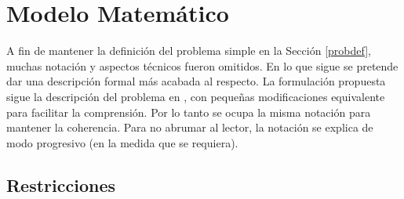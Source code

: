 \documentclass[letter, 10pt]{article}
\begin{document}
\section{Modelo Matemático} \label{model}
A fin de mantener la definición del problema simple en la Sección \ref{probdef}, muchas notación y aspectos técnicos fueron omitidos. En lo que sigue se pretende dar una descripción formal más acabada al respecto. La formulación propuesta sigue la descripción del problema en \cite{Problem}, con pequeñas modificaciones equivalente para facilitar la comprensión. Por lo tanto se ocupa la misma notación para mantener la coherencia. Para no abrumar al lector, la notación se explica de modo progresivo (en la medida que se requiera).

\subsection{Restricciones}
\end{document}
